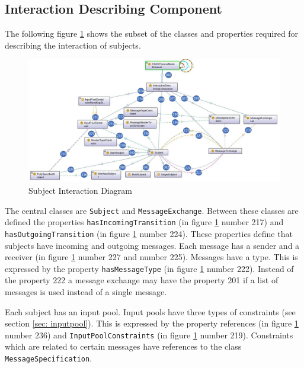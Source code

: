 \subsection{Interaction Describing Component}

The following figure \ref{fig:ontogrsubjectinteraction} shows the subset of the classes and properties required for describing the interaction of subjects. 

\begin{figure}[htbp]
	\centering
	\includegraphics[width=1.0\linewidth]{Figures/Ontology/SubjectInteraction/OntoGrSubjectInteraction}
	\caption[Subject Interaction Diagram]{Subject Interaction Diagram}
	\label{fig:ontogrsubjectinteraction}
\end{figure}

The central classes are \texttt{Subject} and \texttt{MessageExchange}. Between these classes are defined the properties \texttt{hasIncomingTransition} (in figure \ref{fig:ontogrsubjectinteraction} number 217) and \texttt{hasOutgoingTransition} (in figure \ref{fig:ontogrsubjectinteraction} number 224). These properties define that subjects have incoming and outgoing messages. Each message has a sender and a receiver (in figure \ref{fig:ontogrsubjectinteraction} number 227 and number 225). Messages have a type. This is expressed by the property \texttt{hasMessageType} (in figure \ref{fig:ontogrsubjectinteraction} number 222). Instead of the property 222 a message exchange may have the property 201 if a list of messages is used instead of a single message.

Each subject has an input pool. Input pools have three types of constraints (see section \ref{sec: inputpool}). This is expressed by the property references  (in figure \ref{fig:ontogrsubjectinteraction} number 236) and \texttt{InputPoolConstraints} (in figure \ref{fig:ontogrsubjectinteraction} number 219). Constraints which are related to certain messages have references to the class \texttt{MessageSpecification}.

